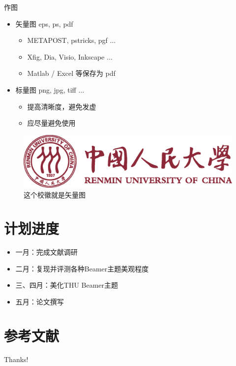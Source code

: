 \documentclass{RucBeamer}
\begin{document}
\begin{frame}{作图}
  \begin{itemize}
    \item 矢量图 eps, ps, pdf
      \begin{itemize}
        \item METAPOST, pstricks, pgf $\ldots$
        \item Xfig, Dia, Visio, Inkscape $\ldots$
        \item Matlab / Excel 等保存为 pdf
      \end{itemize}
    \item 标量图 png, jpg, tiff $\ldots$
      \begin{itemize}
        \item 提高清晰度，避免发虚
        \item 应尽量避免使用
      \end{itemize}
  \end{itemize}
  \begin{figure}[htpb]
    \centering
    \includegraphics[width=0.2\linewidth]{RucBeamerAssets/Renmin_Univ_Logo.eps}
    \caption{这个校徽就是矢量图}
  \end{figure}
\end{frame}

\section{计划进度}
\begin{frame}
  \begin{itemize}
    \item 一月：完成文献调研
    \item 二月：复现并评测各种Beamer主题美观程度
    \item 三、四月：美化THU Beamer主题
    \item 五月：论文撰写
  \end{itemize}
\end{frame}

\section{参考文献}

\begin{frame}[allowframebreaks]
  
  
\end{frame}

\begin{frame}
  \begin{center}
    {\Huge\calligra Thanks!}
  \end{center}
\end{frame}
\end{document}
